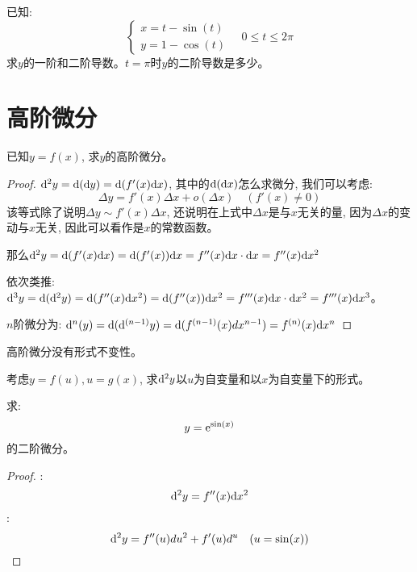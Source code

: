 \begin{example}[(旋轮线)]
    已知:
    \begin{equation*}
        \left\{
            \begin{aligned}
                x = t - \sin(t) \\
                y = 1 - \cos(t)
            \end{aligned}
        \right.
        \quad 0 \le t \le 2\pi
    \end{equation*}
    求$y$的一阶和二阶导数。$t= \pi$时$y$的二阶导数是多少。
\end{example}

\section{高阶微分}
\begin{problem}
    已知$y = f(x)$, 求$y$的高阶微分。
\end{problem}
\begin{proof}
    $\mathrm{d}^2 y = \mathrm{d}(\mathrm{d} y) = \mathrm{d}(f'(x)\mathrm{d} x)$, 其中的$\mathrm{d}(\mathrm{d} x)$怎么求微分, 我们可以考虑:
    \begin{equation*}
        \Delta y = f'(x)\Delta x +o(\Delta x) \quad (f'(x) \neq 0)
    \end{equation*}
    该等式除了说明$\Delta y \sim f'(x) \Delta x$, 还说明在上式中$\Delta x$是与$x$无关的量, 因为$\Delta x$的变动与$x$无关, 因此可以看作是$x$的常数函数。

    那么$\mathrm{d}^2 y = \mathrm{d}(f'(x)\mathrm{d} x) = \mathrm{d}(f'(x))\mathrm{d} x = f''(x)\mathrm{d} x \cdot \mathrm{d} x = f''(x)\mathrm{d} x^2$

    依次类推: $\mathrm{d}^3 y = \mathrm{d}(\mathrm{d}^2 y) = \mathrm{d}(f''(x)\mathrm{d} x^2) = \mathrm{d}(f''(x))\mathrm{d} x^2 = f'''(x)\mathrm{d} x \cdot \mathrm{d} x^2 = f'''(x)\mathrm{d} x^3$。
    
    $n$阶微分为: $\mathrm{d}^n(y) = \mathrm{d}(\mathrm{d}^{(n-1)}y) = \mathrm{d}(f^{(n-1)}(x)dx^{n-1}) = f^{(n)}(x)\mathrm{d} x^n$
\end{proof}

\begin{remark}
    高阶微分没有形式不变性。
\end{remark}
\begin{problem}
    考虑$y = f(u), u = g(x)$, 求$\mathrm{d}^2 y$以$u$为自变量和以$x$为自变量下的形式。
\end{problem}

\begin{example}
    求:
    \begin{equation*}
        y = \mathrm{e}^{\sin(x)}
    \end{equation*}
    的二阶微分。
\end{example}
\begin{proof}
    :
    \begin{equation*}
        \mathrm{d}^2 y = f''(x)\mathrm{d} x^2
    \end{equation*}
    :
    \begin{equation*}
        \mathrm{d}^2 y = f''(u)du^2+f'(u)d^u \quad (u = \sin(x))
    \end{equation*}
\end{proof}

